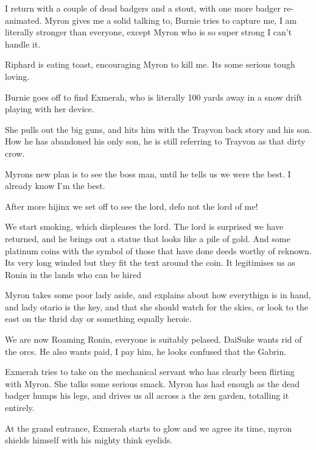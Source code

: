 I return with a couple of dead badgers and a stout, with one more badger re-animated. Myron gives me a solid talking to, Burnie tries to capture me, I am literally stronger than everyone, except Myron who is so super strong I can't handle it.\medskip

Riphard is eating toast, encouraging Myron to kill me. Its some serious tough loving.\medskip

Burnie goes off to find Exmerah, who is literally 100 yards away in a snow drift playing with her device.\medskip

She pulls out the big guns, and hits him with the Trayvon back story and his son. How he has abandoned his only son, he is still referring to Trayvon as that dirty crow.\medskip

Myrons new plan is to see the boss man, until he tells us we were the best. I already know I'm the best.\medskip

After more hijinx we set off to see the lord, defo not the lord of me!\medskip

We start smoking, which displeases the lord. The lord is surprised we have returned, and he brings out a statue that looks like a pile of gold. And some platinum coins with the symbol of those that have done deeds worthy of reknown. Its very long winded but they fit the text around the coin. It legitimises us as Ronin in the lands who can be hired\medskip

Myron takes some poor lady aside, and explains about how everythign is in hand, and lady otario is the key, and that she should watch for the skies, or look to the east on the thrid day or something equally heroic.\medskip

We are now Roaming Ronin, everyone is suitably pelased. DaiSuke wants rid of the orcs. He also wants paid, I pay him, he looks confused that the Gabrin.\medskip

Exmerah tries to take on the mechanical servant who has clearly been flirting with Myron. She talks some serious smack. Myron has had enough as the dead badger humps his legs, and drives us all across a the zen garden, totalling it entirely.\medskip

At the grand entrance, Exmerah starts to glow and we agree its time, myron shields himself with his mighty think eyelids.\medskip


